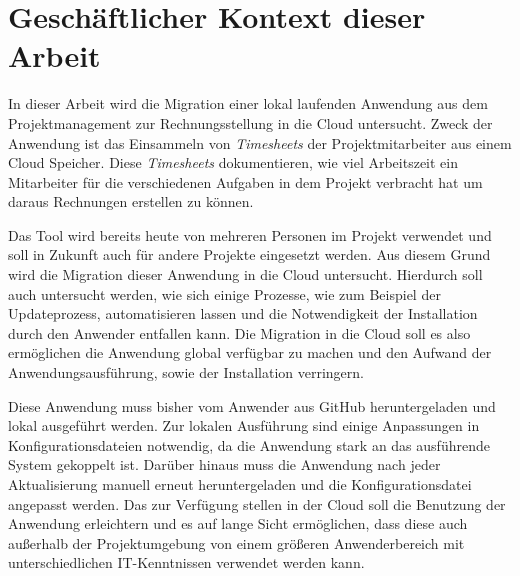 \section{Geschäftlicher Kontext dieser Arbeit}

In dieser Arbeit wird die Migration einer lokal laufenden Anwendung aus dem Projektmanagement zur Rechnungsstellung in die Cloud untersucht. Zweck der Anwendung ist das Einsammeln von \textit{\glspl{Timesheet}} der Projektmitarbeiter aus einem Cloud Speicher. Diese \textit{\glspl{Timesheet}} dokumentieren, wie viel Arbeitszeit ein Mitarbeiter für die verschiedenen Aufgaben in dem Projekt verbracht hat um daraus Rechnungen erstellen zu können.

Das Tool wird bereits heute von mehreren Personen im Projekt verwendet und soll in Zukunft auch für andere Projekte eingesetzt werden. Aus diesem Grund wird die Migration dieser Anwendung in die Cloud untersucht.
Hierdurch soll auch untersucht werden, wie sich einige Prozesse, wie zum Beispiel der Updateprozess, automatisieren lassen und die Notwendigkeit der Installation durch den Anwender entfallen kann. Die Migration in die Cloud soll es also ermöglichen die Anwendung global verfügbar zu machen und den Aufwand der Anwendungsausführung, sowie der Installation verringern.

 Diese Anwendung muss bisher vom Anwender aus GitHub heruntergeladen und lokal ausgeführt werden. Zur lokalen Ausführung sind einige Anpassungen in Konfigurationsdateien notwendig, da die Anwendung stark an das ausführende System gekoppelt ist. Darüber hinaus muss die Anwendung nach jeder Aktualisierung manuell erneut heruntergeladen und die Konfigurationsdatei angepasst werden. Das zur Verfügung stellen in der Cloud soll die Benutzung der Anwendung erleichtern und es auf lange Sicht ermöglichen, dass diese auch außerhalb der Projektumgebung von einem größeren Anwenderbereich mit unterschiedlichen IT-Kenntnissen verwendet werden kann.